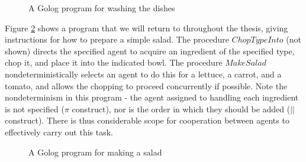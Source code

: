 %
\begin{figure}
\begin{centering}
\par\end{centering}

\caption{A Golog program for washing the dishes\label{fig:Background:Golog:Washing-Dishes}}

\end{figure}


Figure \ref{fig:Background:Golog:MakeSalad} shows a program that
we will return to throughout the thesis, giving instructions for how
to prepare a simple salad. The procedure $ChopTypeInto$ (not shown)
directs the specified agent to acquire an ingredient of the specified
type, chop it, and place it into the indicated bowl. The procedure
$MakeSalad$ nondeterministically selects an agent to do this for
a lettuce, a carrot, and a tomato, and allows the chopping to proceed
concurrently if possible. Note the nondeterminism in this program
- the agent assigned to handling each ingredient is not specified
($\pi$ construct), nor is the order in which they should be added
($||$ construct). There is thus considerable scope for cooperation
between agents to effectively carry out this task.

%
\begin{figure}
\begin{centering}
\par\end{centering}

\caption{A Golog program for making a salad\label{fig:Background:Golog:MakeSalad}}

\end{figure}



